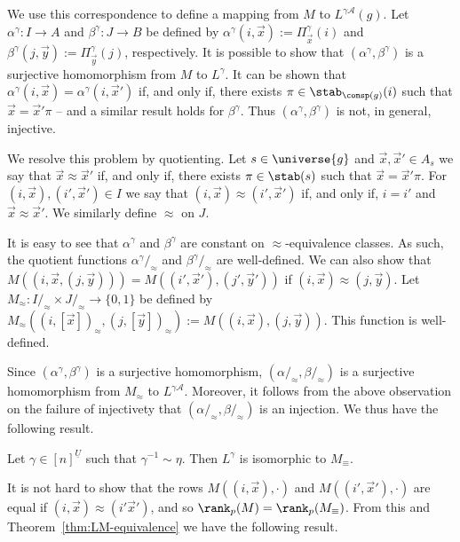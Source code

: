 \documentclass[a4paper,UKenglish]{lipics-v2018}
\begin{document}
We use this correspondence to define a mapping from $M$ to $L^{\gamma
  \mathcal{A}}(g)$. Let $\alpha^{\gamma}: I \rightarrow A$ and $\beta^{\gamma}:
J \rightarrow B$ be defined by $\alpha^{\gamma} (i, \vec{x}) :=
\Pi^{\gamma}_{\vec{x}}(i)$ and $\beta^{\gamma} (j, \vec{y}) :=
\Pi^{\gamma}_{\vec{y}}(j)$, respectively. It is possible to show that
$(\alpha^{\gamma}, \beta^{\gamma})$ is a surjective homomorphism from $M$ to
$L^{\gamma}$.  It can be shown that $\alpha^{\gamma}(i, \vec{x}) =
\alpha^{\gamma}(i, \vec{x}')$ if, and only if, there exists $\pi \in
\stab_{\consp(g)}(i)$ such that $\vec{x} = \vec{x}' \pi$ -- and a similar result
holds for $\beta^{\gamma}$.  Thus $(\alpha^{\gamma}, \beta^{\gamma})$
is not, in general, injective.

We resolve this problem by quotienting. Let $s \in \universe{g}$ and $\vec{x},
\vec{x}' \in A_s$ we say that $\vec{x} \approx \vec{x}'$ if, and only if, there
exists $\pi \in \stab(s)$ such that $\vec{x} = \vec{x}' \pi$. For $(i, \vec{x}),
(i', \vec{x}') \in I$ we say that $(i, \vec{x}) \approx (i', \vec{x}')$ if, and
only if, $i = i'$ and $\vec{x} \approx \vec{x}'$. We similarly define $\approx$
on $J$.

It is easy to see that $\alpha^{\gamma}$ and $\beta^{\gamma}$ are constant on
$\approx$-equivalence classes. As such, the quotient functions $\alpha^\gamma
/_\approx$ and $\beta^{\gamma} /_\approx$ are well-defined. We can also show
that $M((i, \vec{x}, (j, \vec{y}))) = M((i',\vec{x}'), (j', \vec{y}'))$ if $(i,
\vec{x}) \approx (j, \vec{y})$. Let $M_{\approx} : I /_{\approx} \times J
/_\approx \rightarrow \{0,1\}$ be defined by $M_\approx ((i, [\vec{x}])_\approx,
(j, [\vec{y}])_\approx) := M((i,\vec{x}), (j, \vec{y}))$.  This function is well-defined.

Since $(\alpha^{\gamma}, \beta^{\gamma})$ is a surjective homomorphism, $(\alpha
/_\approx, \beta /_\approx)$ is a surjective homomorphism from $M_\approx$ to
$L^{\gamma \mathcal{A}}$. Moreover, it follows from the above observation on the
failure of injectivety that $(\alpha /_\approx, \beta /_\approx)$ is an
injection. We thus have the following result.

\begin{theorem}
	Let $\gamma \in [n]^{\underline{U}}$ such that $\gamma^{-1} \sim \eta$. Then
  $L^{\gamma}$ is isomorphic to $M_{\equiv}$.
	\label{thm:LM-equivalence}
\end{theorem}

It is not hard to show that the rows $M ((i, \vec{x}), \cdot)$ and $M((i',
\vec{x}'), \cdot)$ are equal if $(i, \vec{x}) \approx (i' \vec{x}')$, and so
$\rank_p (M) = \rank_p(M_\equiv)$. From this and
Theorem~\ref{thm:LM-equivalence} we have the following result.
\end{document}

